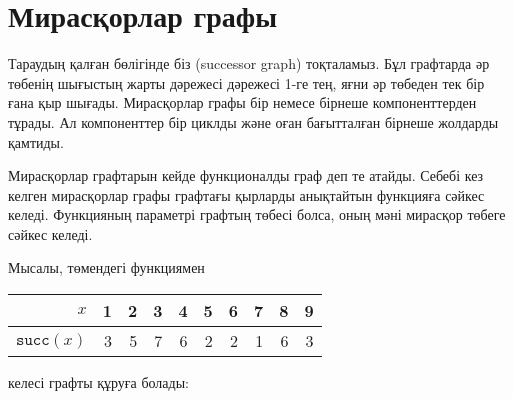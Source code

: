 
\section{Мирасқорлар графы}


Тараудың қалған бөлігінде біз  (successor graph) тоқталамыз.
Бұл графтарда әр төбенің шығыстың жарты дәрежесі дәрежесі 1-ге тең, яғни әр төбеден
тек бір ғана қыр шығады.
Мирасқорлар графы бір немесе бірнеше компоненттерден тұрады.
Ал компоненттер бір циклды және оған бағытталған бірнеше жолдарды қамтиды.

Мирасқорлар графтарын кейде функционалды граф деп те
атайды. Себебі кез келген мирасқорлар графы графтағы
қырларды анықтайтын функцияға сәйкес келеді. 
Функцияның параметрі графтың төбесі болса,
оның мәні мирасқор төбеге сәйкес келеді.

Мысалы, төмендегі функциямен
\begin{center}
\begin{tabular}{r|rrrrrrrrr}
$x$ & 1 & 2 & 3 & 4 & 5 & 6 & 7 & 8 & 9 \\
\hline
$\texttt{succ}(x)$ & 3 & 5 & 7 & 6 & 2 & 2 & 1 & 6 & 3 \\
\end{tabular}
\end{center}
келесі графты құруға болады:
\begin{center}
\end{center}

